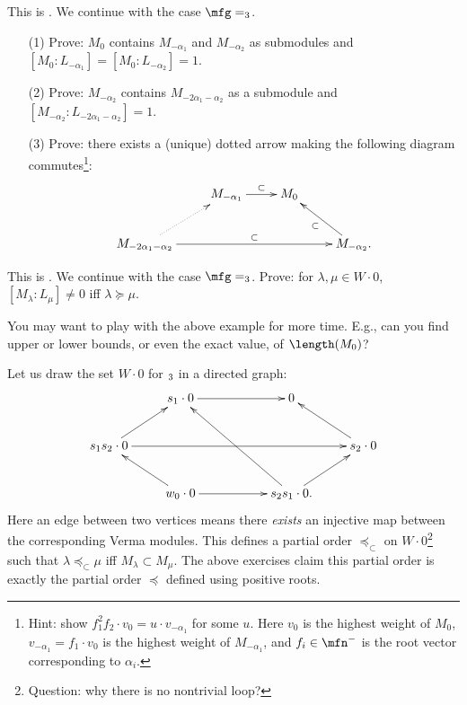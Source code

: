 	\begin{exe}
		This is . We continue with the case $\mfg = \sl_3$.
		\begin{itemize}
			\item[(1)]
				Prove: $M_0$ contains $M_{-\alpha_1}$ and $M_{-\alpha_2}$ as submodules and $[M_0: L_{-\alpha_1}]=[M_0: L_{-\alpha_2}]=1$.
			\item[(2)]
				Prove: $M_{-\alpha_2}$ contains $M_{-2\alpha_1-\alpha_2}$ as a submodule and $[M_{-\alpha_2}: L_{-2\alpha_1-\alpha_2}] = 1$.
			\item[(3)]
				Prove: there exists a (unique) dotted arrow making the following diagram commutes\footnote{Hint: show $f_1^2 f_2 \cdot v_0 = u \cdot v_{-\alpha_1}$ for some $u$. Here $v_0$ is the highest weight of $M_0$, $v_{-\alpha_1} = f_1 \cdot v_0$ is the highest weight of $M_{-\alpha_1}$, and $f_i\in \mfn^-$ is the root vector corresponding to $\alpha_i$.}:
				\[
					\xymatrix{
						& M_{-\alpha_1} \ar[r]^-\subset
						& M_0 \\
						M_{-2\alpha_1-\alpha_2} \ar[rrr]^-\subset \ar@{.>}[ru]
						& & & M_{-\alpha_2}. \ar[lu]^-\subset
					}
				\]
			
		\end{itemize}
	\end{exe}

	\begin{exe}
		This is . We continue with the case $\mfg = \sl_3$. Prove: for $\lambda,\mu \in W\cdot 0$, $[M_\lambda: L_\mu] \neq 0$ iff $\lambda \succeq \mu$.
	\end{exe}

	\begin{rem}
		You may want to play with the above example for more time. E.g., can you find upper or lower bounds, or even the exact value, of $\length(M_0)$?
	\end{rem}

	Let us draw the set $W\cdot 0$ for $\sl_3$ in a directed graph:
	\[
		\xymatrix{
			& s_1\cdot 0 \ar[rr]
			& &  0 \\
			s_1s_2\cdot 0 \ar[ru] \ar[rrrr]
			& & & & s_2\cdot 0 \ar[lu] \\
			& w_0\cdot 0 \ar[rr] \ar[lu]
			& & s_2s_1\cdot 0. \ar[ru] \ar[lluu]
		}
	\]
	Here an edge between two vertices means there \emph{exists} an injective map between the corresponding Verma modules. This defines a partial order $\preceq_\subset$ on $W\cdot 0$\footnote{Question: why there is no nontrivial loop?} such that $\lambda\preceq_\subset \mu$ iff $M_{\lambda} \subset M_\mu$. The above exercises claim this partial order is exactly the partial order $\preceq$ defined using positive roots. 

